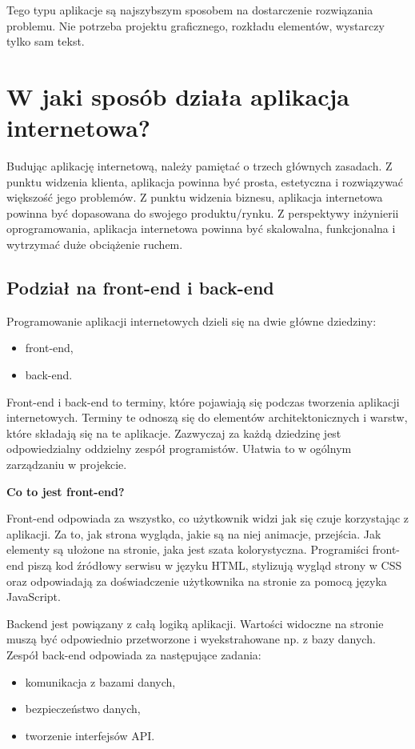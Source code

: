 Tego typu aplikacje są najszybszym sposobem na dostarczenie rozwiązania problemu. Nie potrzeba projektu graficznego, rozkładu elementów, wystarczy tylko sam tekst.


\section{W jaki sposób działa aplikacja internetowa?}

Budując aplikację internetową, należy pamiętać o trzech głównych zasadach. Z punktu widzenia klienta, aplikacja powinna być prosta, estetyczna i rozwiązywać większość jego problemów. Z punktu widzenia biznesu, aplikacja internetowa powinna być dopasowana do swojego produktu/rynku. Z perspektywy inżynierii oprogramowania, aplikacja internetowa powinna być skalowalna, funkcjonalna i wytrzymać duże obciążenie ruchem.

\subsection{Podział na front-end i back-end}
Programowanie aplikacji internetowych dzieli się na dwie główne dziedziny:
\begin{itemize}
    \item front-end,
    \item back-end.
\end{itemize}

Front-end i back-end to terminy, które pojawiają się podczas tworzenia aplikacji internetowych. Terminy te odnoszą się do elementów architektonicznych i warstw, które składają się na te aplikacje. Zazwyczaj za każdą dziedzinę jest odpowiedzialny oddzielny zespół programistów. Ułatwia to w ogólnym zarządzaniu w projekcie.

\textbf{Co to jest front-end?}

Front-end odpowiada za wszystko, co użytkownik widzi jak się czuje korzystając z aplikacji. Za to, jak strona wygląda, jakie są na niej animacje, przejścia. Jak elementy są ułożone na stronie, jaka jest szata kolorystyczna. Programiści front-end piszą kod źródłowy serwisu w języku HTML, stylizują wygląd strony w CSS oraz odpowiadają za doświadczenie użytkownika na stronie za pomocą języka JavaScript.


Backend jest powiązany z całą logiką aplikacji. Wartości widoczne na stronie muszą być odpowiednio przetworzone i wyekstrahowane np. z bazy danych. Zespół back-end odpowiada za następujące zadania:
\begin{itemize}
    \item komunikacja z bazami danych,
    \item bezpieczeństwo danych,
    \item tworzenie interfejsów API.
\end{itemize}


